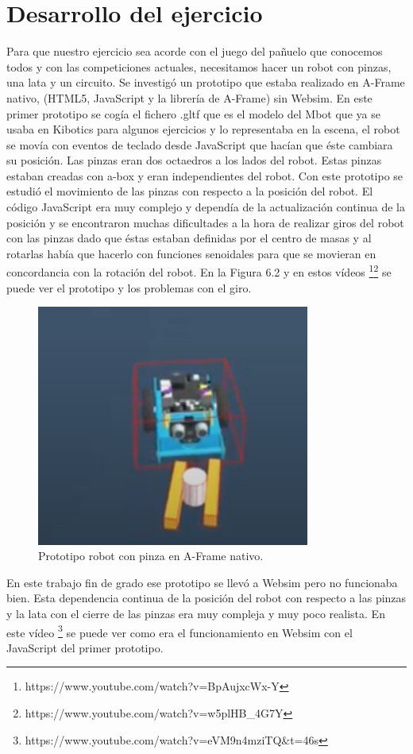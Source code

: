 \section{Desarrollo del ejercicio}

Para que nuestro ejercicio sea acorde con el juego del pañuelo que conocemos todos y con las competiciones actuales, necesitamos hacer un robot con pinzas, una lata  y un circuito.
Se investigó un prototipo que estaba realizado en A-Frame nativo, (HTML5, JavaScript y la librería de A-Frame) sin Websim.
En este primer prototipo se cogía el fichero .gltf  que es el modelo del Mbot que ya se usaba en Kibotics para algunos ejercicios y lo representaba en la escena, el robot se movía con eventos de teclado desde JavaScript que hacían que éste cambiara su posición. Las pinzas eran dos octaedros a los lados del robot. Estas pinzas estaban creadas con a-box y eran  independientes del robot. Con este prototipo se estudió el movimiento de las pinzas con respecto a la posición del robot. El código JavaScript era muy complejo y dependía de la actualización continua de la posición y se encontraron muchas dificultades a la hora de realizar giros del robot con las pinzas dado que éstas estaban definidas por el centro de masas y al rotarlas había que hacerlo con funciones senoidales para que se movieran en concordancia con la rotación del robot. En la Figura 6.2 y en estos vídeos \footnote{https://www.youtube.com/watch?v=BpAujxcWx-Y}\footnote{https://www.youtube.com/watch?v=w5plHB\_4G7Y} se puede ver el prototipo y los problemas con el giro.

 \begin{figure}[H]
  \centering
 \includegraphics[width=0.8\textwidth, height=0.5\textwidth]{chapters/images/prototipo.png}
  \caption{Prototipo robot con pinza en A-Frame nativo.}
\end{figure}

En este trabajo fin de grado ese prototipo se llevó a Websim pero no funcionaba bien. Esta dependencia continua de la posición del robot con respecto a las pinzas y la lata con el cierre de las pinzas era muy compleja y muy poco realista. En este vídeo  \footnote{https://www.youtube.com/watch?v=eVM9n4mziTQ\&t=46s} se puede ver como era el funcionamiento en Websim con el JavaScript del primer prototipo.  


